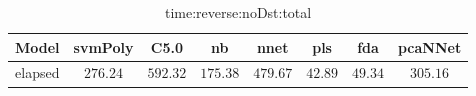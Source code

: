 \begin{table}[!ht]
	\centering
	\begin{tabular}{|c|c|c|c|c|c|c|c|}
		\hline
		Model & svmPoly & C5.0 & nb & nnet & pls & fda & pcaNNet \\ \hline
		elapsed & $276.24$ & $592.32$ & $175.38$ & $479.67$ & $42.89$ & $49.34$ & $305.16$ \\ \hline
	\end{tabular}
	\caption{time:reverse:noDst:total}
	\label{tab:time:reverse:noDst:total}
\end{table}
